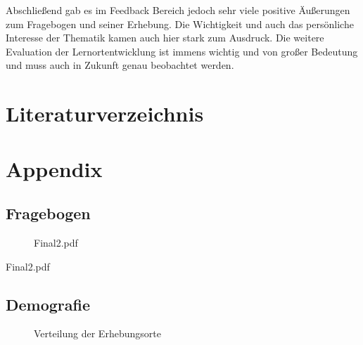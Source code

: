 \documentclass[11pt, a4paper]{article}
\begin{document}
Abschließend gab es im Feedback Bereich jedoch sehr viele positive Äußerungen zum Fragebogen und seiner Erhebung. Die Wichtigkeit und auch das persönliche Interesse der Thematik kamen auch hier stark zum Ausdruck. Die weitere Evaluation der Lernortentwicklung ist immens wichtig und von großer Bedeutung und muss auch in Zukunft genau beobachtet werden.




\newpage
\newpage
\section{Literaturverzeichnis}
\printbibliography
\newpage
\section{Appendix}
\subsection{Fragebogen}
\begin{figure}[h]
 {Final2.pdf}
\end{figure}
\newpage
 {Final2.pdf}
\newpage
\subsection{Demografie}
\begin{figure}[h]
	\centering
	
	\caption{Verteilung der Erhebungsorte}
\end{figure}
\end{document}
